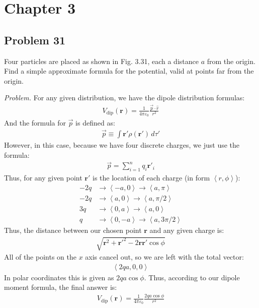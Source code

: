 \documentclass[10pt,oneside]{book}
\newcommand{\gspc}{\vspace{0.13cm}} %
\newenvironment{problem}[1]
  {\vspace{-0.1cm}\begin{tcolorbox}[problembox]
   \textit{Problem. }#1}
  {\end{tcolorbox}\gspc}
\newcommand{\pvec}[1]{\left\langle#1\right\rangle}
\begin{document}
\newcommand{\vE}{{\mathbf{E}}}
\newcommand{\vr}{{\mathbf{r}}}
\newcommand{\fpie}{\frac{1}{4\pi\varepsilon_0}}

\section*{Chapter 3}
\subsection*{Problem 31}
Four particles are placed as shown in Fig. 3.31, each a distance $a$ from the origin. Find a simple approximate formula for the potential, valid at points far from the origin. 
\begin{problem}
  For any given distribution, we have the dipole distribution formulas:
  \begin{align*}
    \boxed{V_\text{dip}(\vr)=\fpie\frac{\vec p \cdot \hat r}{r^2}}
  \end{align*}
  And the formula for $\vec p$ is defined as:
  \begin{align*}
    \boxed{\vec p \equiv \int \vr'\rho(\vr')\,d\tau'}
  \end{align*}
  However, in this case, because we have four discrete charges, we just use the formula:
  \begin{align*}
    \vec p = \sum_{i = 1}^{n}q_i\vr'_i
  \end{align*}
  Thus, for any given point $\vr'$ is the location of each charge (in form $\pvec{r, \phi}$):
  \begin{align*}
    -2q &\to \pvec{-a, 0}\to \pvec{a, \pi}\\
    -2q &\to \pvec{a, 0}\to \pvec{a, \pi/2}\\
    3q &\to \pvec{0, a}\to \pvec{a, 0}\\
    q &\to \pvec{0, -a} \to \pvec{a, 3\pi/2}
  \end{align*}
  Thus, the distance between our chosen point $\vr$ and any given charge is:
  \begin{align*}
    \sqrt{\vr^2 + \vr'^2 - 2\vr\vr'\cos\phi}
  \end{align*}
  All of the points on the $x$ axis cancel out, so we are left with the total vector:
  \begin{align*}
    \pvec{2qa, 0, 0}
  \end{align*}
  In polar coordinates this is given as $2qa\cos\phi$. Thus, according to our dipole moment formula, the final answer is:
  \begin{align*}
    V_\text{dip}(\vr) = \fpie \frac{2qa\cos\phi}{r^2}
  \end{align*}
\end{problem}
\end{document}

